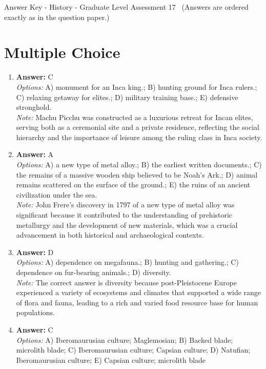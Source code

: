 \documentclass[12pt]{article}
\begin{document}
\begin{center}
Answer Key - History - Graduate Level Assessment 17 \
\small (Answers are ordered exactly as in the question paper.)
\end{center}

\section*{Multiple Choice}
\begin{enumerate}[label=\arabic*.]
\item \textbf{Answer:} C
\\ \textit{Options:} A) monument for an Inca king.; B) hunting ground for Inca rulers.; C) relaxing getaway for elites.; D) military training base.; E) defensive stronghold.
\\ \textit{Note:} Machu Picchu was constructed as a luxurious retreat for Incan elites, serving both as a ceremonial site and a private residence, reflecting the social hierarchy and the importance of leisure among the ruling class in Inca society.
\item \textbf{Answer:} A
\\ \textit{Options:} A) a new type of metal alloy.; B) the earliest written documents.; C) the remains of a massive wooden ship believed to be Noah's Ark.; D) animal remains scattered on the surface of the ground.; E) the ruins of an ancient civilization under the sea.
\\ \textit{Note:} John Frere's discovery in 1797 of a new type of metal alloy was significant because it contributed to the understanding of prehistoric metallurgy and the development of new materials, which was a crucial advancement in both historical and archaeological contexts.
\item \textbf{Answer:} D
\\ \textit{Options:} A) dependence on megafauna.; B) hunting and gathering.; C) dependence on fur-bearing animals.; D) diversity.
\\ \textit{Note:} The correct answer is diversity because post-Pleistocene Europe experienced a variety of ecosystems and climates that supported a wide range of flora and fauna, leading to a rich and varied food resource base for human populations.
\item \textbf{Answer:} C
\\ \textit{Options:} A) Iberomaurusian culture; Maglemosian; B) Backed blade; microlith blade; C) Iberomaurusian culture; Capsian culture; D) Natufian; Iberomaurusian culture; E) Capsian culture; microlith blade

\end{enumerate}
\end{document}
